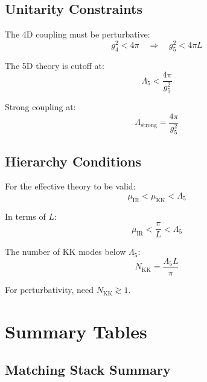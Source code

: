 \documentclass[11pt,a4paper]{article}
\begin{document}
\subsection{Unitarity Constraints}
\label{app:unitarity}

The 4D coupling must be perturbative:
\begin{equation}
\label{eq:perturbative}
g_4^2 < 4\pi \quad \Rightarrow \quad g_5^2 < 4\pi L
\end{equation}

The 5D theory is cutoff at:
\begin{equation}
\label{eq:5d-cutoff}
\Lambda_5 < \frac{4\pi}{g_5^2}
\end{equation}

Strong coupling at:
\begin{equation}
\label{eq:strong-coupling}
\Lambda_{\text{strong}} = \frac{4\pi}{g_5^2}
\end{equation}

\subsection{Hierarchy Conditions}
\label{app:hierarchy}

For the effective theory to be valid:
\begin{equation}
\label{eq:hierarchy-1}
\mu_{\text{IR}} < \mu_{\text{KK}} < \Lambda_5
\end{equation}

In terms of $L$:
\begin{equation}
\label{eq:hierarchy-2}
\mu_{\text{IR}} < \frac{\pi}{L} < \Lambda_5
\end{equation}

The number of KK modes below $\Lambda_5$:
\begin{equation}
\label{eq:n-kk}
N_{\text{KK}} = \frac{\Lambda_5 L}{\pi}
\end{equation}

For perturbativity, need $N_{\text{KK}} \gtrsim 1$.

\section{Summary Tables}
\label{app:summary}

\subsection{Matching Stack Summary}
\label{app:matching-summary}
\end{document}
